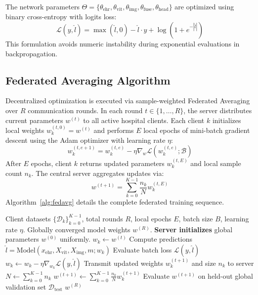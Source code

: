 \documentclass[10pt,conference]{IEEEtran}
\begin{document}
The network parameters $\Theta = \{\theta_{\mathrm{ehr}}, \theta_{\mathrm{vit}}, \theta_{\mathrm{img}}, \theta_{\mathrm{fuse}}, \theta_{\mathrm{head}}\}$ are optimized using binary cross-entropy with logits loss:
\begin{equation}
    \mathcal{L}(y, \hat{l}) = \max(\hat{l}, 0) - \hat{l} \cdot y + \log(1 + e^{-|\hat{l}|})
\end{equation}
This formulation avoids numeric instability during exponential evaluations in backpropagation.

\subsection{Federated Averaging Algorithm}
Decentralized optimization is executed via sample-weighted Federated Averaging over $R$ communication rounds. In each round $t \in \{1, \dots, R\}$, the server distributes current parameters $w^{(t)}$ to all active hospital clients. Each client $k$ initializes local weights $w_k^{(t, 0)} = w^{(t)}$ and performs $E$ local epochs of mini-batch gradient descent using the Adam optimizer with learning rate $\eta$:
\begin{equation}
    w_k^{(t, e+1)} = w_k^{(t, e)} - \eta \nabla_{w} \mathcal{L}(w_k^{(t, e)}; \mathcal{B})
\end{equation}
After $E$ epochs, client $k$ returns updated parameters $w_k^{(t, E)}$ and local sample count $n_k$. The central server aggregates updates via:
\begin{equation}
    w^{(t+1)} = \sum_{k=0}^{K-1} \frac{n_k}{N} w_k^{(t, E)}
\end{equation}
Algorithm~\ref{alg:fedavg} details the complete federated training sequence.

\begin{algorithm}[!t]
\caption{Presence-Masked Federated Multimodal Training}
\label{alg:fedavg}
\begin{algorithmic}[1]
\REQUIRE Client datasets $\{\mathcal{D}_k\}_{k=0}^{K-1}$, total rounds $R$, local epochs $E$, batch size $B$, learning rate $\eta$.
\ENSURE Globally converged model weights $w^{(R)}$.
\STATE \textbf{Server initializes} global parameters $w^{(0)}$ uniformly.
        \STATE $w_k \leftarrow w^{(t)}$
                \STATE Compute predictions $\hat{l} = \text{Model}(x_{\mathrm{ehr}}, X_{\mathrm{vit}}, X_{\mathrm{img}}, m; w_k)$
                \STATE Evaluate batch loss $\mathcal{L}(y, \hat{l})$
                \STATE $w_k \leftarrow w_k - \eta \nabla_{w_k} \mathcal{L}(y, \hat{l})$
            \ENDFOR
        \ENDFOR
        \STATE Transmit updated weights $w_k^{(t+1)}$ and size $n_k$ to server
    \ENDFOR
    \STATE $N \leftarrow \sum_{k=0}^{K-1} n_k$
    \STATE $w^{(t+1)} \leftarrow \sum_{k=0}^{K-1} \frac{n_k}{N} w_k^{(t+1)}$
    \STATE Evaluate $w^{(t+1)}$ on held-out global validation set $\mathcal{D}_{\mathrm{test}}$
\ENDFOR
\RETURN $w^{(R)}$
\end{algorithmic}
\end{algorithm}
\end{document}
